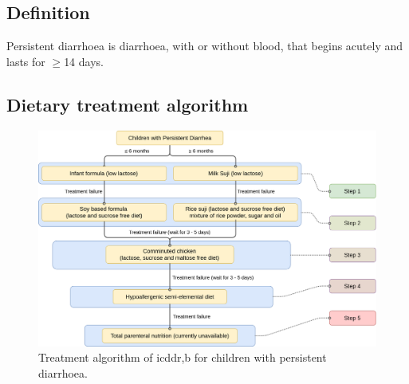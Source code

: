 \documentclass[11pt,a4paper]{report}
\begin{document}
\subsection{Definition}
Persistent diarrhoea is diarrhoea, with or without blood, that begins acutely and lasts for $\geq$14 days. \cite{islam2018management} 

\subsection{Dietary treatment algorithm}
\begin{figure}[htp]
	\centering \includegraphics[scale=0.22]{pd_algorithm.png}
	\centering \caption[PD treatment algorithm]{Treatment algorithm of icddr,b for children with persistent diarrhoea. \cite{islam2018management}}
	\label{PD}
\end{figure}
\end{document}
